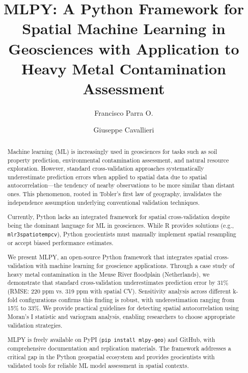 \documentclass[review,12pt]{elsarticle}
\begin{document}
\begin{frontmatter}

\title{MLPY: A Python Framework for Spatial Machine Learning in Geosciences with Application to Heavy Metal Contamination Assessment}

\author[usach]{Francisco Parra O.}
\author[usach]{Giuseppe Cavallieri}



\begin{abstract}
Machine learning (ML) is increasingly used in geosciences for tasks such as soil property prediction, environmental contamination assessment, and natural resource exploration. However, standard cross-validation approaches systematically underestimate prediction errors when applied to spatial data due to spatial autocorrelation---the tendency of nearby observations to be more similar than distant ones. This phenomenon, rooted in Tobler's first law of geography, invalidates the independence assumption underlying conventional validation techniques.

Currently, Python lacks an integrated framework for spatial cross-validation despite being the dominant language for ML in geosciences. While R provides solutions (e.g., \texttt{mlr3spatiotempcv}), Python geocientists must manually implement spatial resampling or accept biased performance estimates.

We present MLPY, an open-source Python framework that integrates spatial cross-validation with machine learning for geoscience applications. Through a case study of heavy metal contamination in the Meuse River floodplain (Netherlands), we demonstrate that standard cross-validation underestimates prediction error by 31\% (RMSE: 220 ppm vs. 319 ppm with spatial CV). Sensitivity analysis across different k-fold configurations confirms this finding is robust, with underestimation ranging from 15\% to 33\%. We provide practical guidelines for detecting spatial autocorrelation using Moran's I statistic and variogram analysis, enabling researchers to choose appropriate validation strategies.

MLPY is freely available on PyPI (\texttt{pip install mlpy-geo}) and GitHub, with comprehensive documentation and replication materials. The framework addresses a critical gap in the Python geospatial ecosystem and provides geocientists with validated tools for reliable ML model assessment in spatial contexts.
\end{abstract}


\end{frontmatter}
\end{document}
